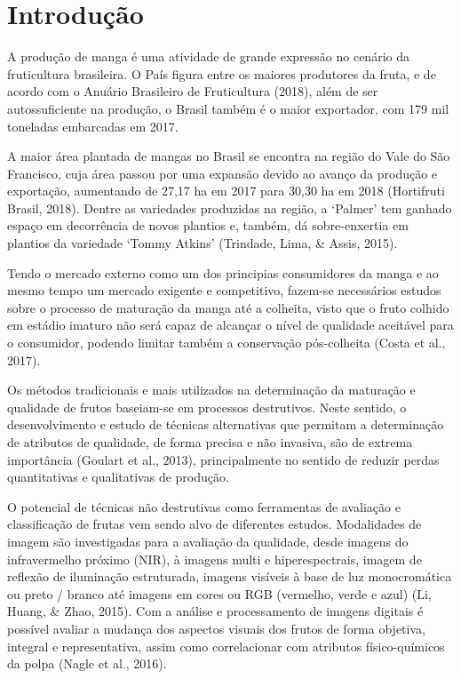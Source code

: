 \section{Introdução}

A produção de manga é uma atividade de grande expressão no cenário da fruticultura brasileira. O País figura entre os maiores produtores da fruta, e de acordo com o Anuário Brasileiro de Fruticultura (2018), além de ser autossuficiente na produção, o Brasil também é o maior exportador, com 179 mil toneladas embarcadas em 2017.

A maior área plantada de mangas no Brasil se encontra na região do Vale do São Francisco, cuja área passou por uma expansão devido ao avanço da produção e exportação, aumentando de 27,17 ha em 2017 para 30,30 ha em 2018 (Hortifruti Brasil, 2018). Dentre as variedades produzidas na região, a ‘Palmer’ tem ganhado espaço em decorrência de novos plantios e, também, dá sobre-enxertia em plantios da variedade ‘Tommy Atkins’ (Trindade, Lima, \& Assis, 2015).

Tendo o mercado externo como um dos principias consumidores da manga e ao mesmo tempo um mercado exigente e competitivo, fazem-se necessários estudos sobre o processo de maturação da manga até a colheita, visto que o fruto colhido em estádio imaturo não será capaz de alcançar o nível de qualidade aceitável para o consumidor, podendo limitar também a conservação pós-colheita (Costa et al., 2017).

Os métodos tradicionais e mais utilizados na determinação da maturação e qualidade de frutos baseiam-se em processos destrutivos. Neste sentido, o desenvolvimento e estudo de técnicas alternativas que permitam a determinação de atributos de qualidade, de forma precisa e não invasiva, são de extrema importância (Goulart et al., 2013), principalmente no sentido de reduzir perdas quantitativas e qualitativas de produção.

O potencial de técnicas não destrutivas como ferramentas de avaliação e classificação de frutas vem sendo alvo de diferentes estudos. Modalidades de imagem são investigadas para a avaliação da qualidade, desde imagens do infravermelho próximo (NIR), à imagens multi e hiperespectrais, imagem de reflexão de iluminação estruturada, imagens visíveis à base de luz monocromática ou preto / branco até imagens em cores ou RGB (vermelho, verde e azul) (Li, Huang, \& Zhao, 2015). Com a análise e processamento de imagens digitais é possível avaliar a mudança dos aspectos visuais dos frutos de forma objetiva, integral e representativa, assim como correlacionar com atributos físico-químicos da polpa (Nagle et al., 2016).


